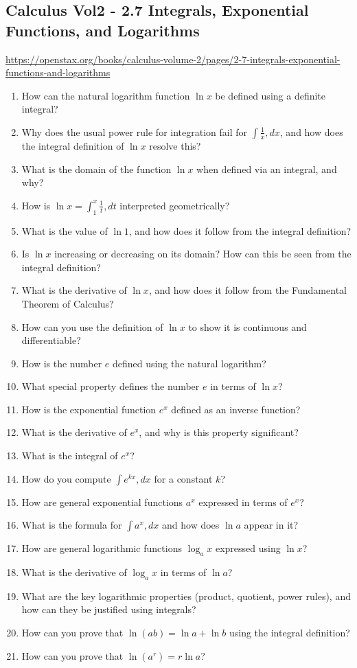 \subsection{Calculus Vol2 - 2.7 Integrals, Exponential Functions, and Logarithms}

\url{https://openstax.org/books/calculus-volume-2/pages/2-7-integrals-exponential-functions-and-logarithms}

\begin{enumerate}
  \item How can the natural logarithm function $\ln x$ be defined using a definite integral?
  \item Why does the usual power rule for integration fail for $\int \frac{1}{x},dx$, and how does the integral definition of $\ln x$ resolve this?
  \item What is the domain of the function $\ln x$ when defined via an integral, and why?
  \item How is $\ln x = \int_1^x \frac{1}{t},dt$ interpreted geometrically?
  \item What is the value of $\ln 1$, and how does it follow from the integral definition?
  \item Is $\ln x$ increasing or decreasing on its domain? How can this be seen from the integral definition?
  \item What is the derivative of $\ln x$, and how does it follow from the Fundamental Theorem of Calculus?
  \item How can you use the definition of $\ln x$ to show it is continuous and differentiable?
  \item How is the number $e$ defined using the natural logarithm?
  \item What special property defines the number $e$ in terms of $\ln x$?
  \item How is the exponential function $e^x$ defined as an inverse function?
  \item What is the derivative of $e^x$, and why is this property significant?
  \item What is the integral of $e^x$?
  \item How do you compute $\int e^{kx},dx$ for a constant $k$?
  \item How are general exponential functions $a^x$ expressed in terms of $e^x$?
  \item What is the formula for $\int a^x,dx$ and how does $\ln a$ appear in it?
  \item How are general logarithmic functions $\log_a x$ expressed using $\ln x$?
  \item What is the derivative of $\log_a x$ in terms of $\ln a$?
  \item What are the key logarithmic properties (product, quotient, power rules), and how can they be justified using integrals?
  \item How can you prove that $\ln(ab) = \ln a + \ln b$ using the integral definition?
  \item How can you prove that $\ln(a^r) = r \ln a$?
\end{enumerate}
